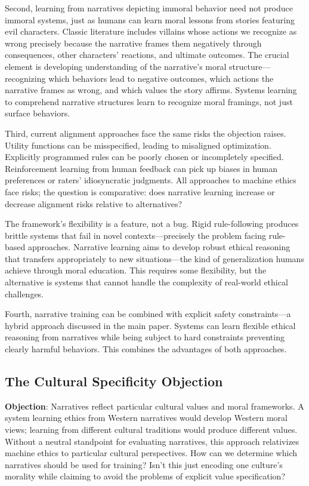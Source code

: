 \documentclass[12pt]{article}
\begin{document}
Second, learning from narratives depicting immoral behavior need not produce immoral systems, just as humans can learn moral lessons from stories featuring evil characters. Classic literature includes villains whose actions we recognize as wrong precisely because the narrative frames them negatively through consequences, other characters' reactions, and ultimate outcomes. The crucial element is developing understanding of the narrative's moral structure---recognizing which behaviors lead to negative outcomes, which actions the narrative frames as wrong, and which values the story affirms. Systems learning to comprehend narrative structures learn to recognize moral framings, not just surface behaviors.

Third, current alignment approaches face the same risks the objection raises. Utility functions can be misspecified, leading to misaligned optimization. Explicitly programmed rules can be poorly chosen or incompletely specified. Reinforcement learning from human feedback can pick up biases in human preferences or raters' idiosyncratic judgments. All approaches to machine ethics face risks; the question is comparative: does narrative learning increase or decrease alignment risks relative to alternatives?

The framework's flexibility is a feature, not a bug. Rigid rule-following produces brittle systems that fail in novel contexts---precisely the problem facing rule-based approaches. Narrative learning aims to develop robust ethical reasoning that transfers appropriately to new situations---the kind of generalization humans achieve through moral education. This requires some flexibility, but the alternative is systems that cannot handle the complexity of real-world ethical challenges.

Fourth, narrative training can be combined with explicit safety constraints---a hybrid approach discussed in the main paper. Systems can learn flexible ethical reasoning from narratives while being subject to hard constraints preventing clearly harmful behaviors. This combines the advantages of both approaches.

\subsection{The Cultural Specificity Objection}

\textbf{Objection}: Narratives reflect particular cultural values and moral frameworks. A system learning ethics from Western narratives would develop Western moral views; learning from different cultural traditions would produce different values. Without a neutral standpoint for evaluating narratives, this approach relativizes machine ethics to particular cultural perspectives. How can we determine which narratives should be used for training? Isn't this just encoding one culture's morality while claiming to avoid the problems of explicit value specification?
\end{document}
